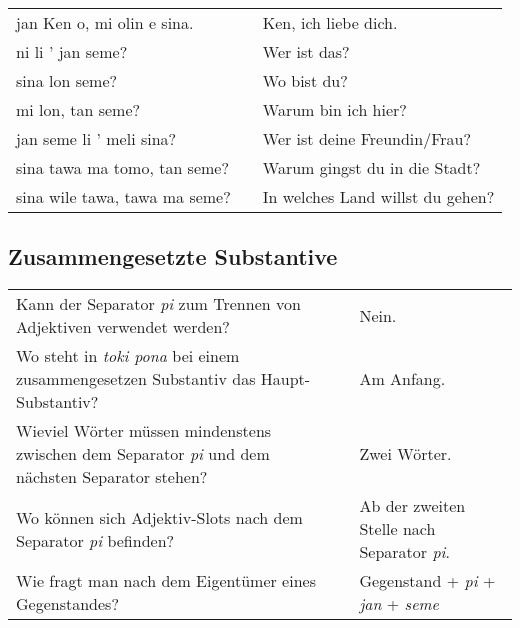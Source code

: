 \begin{supertabular}{p{5,5cm}|ll}
jan Ken o, mi olin e sina.  && Ken, ich liebe dich. \\
ni li ' jan seme?  && Wer ist das? \\
sina lon seme?  && Wo bist du? \\ 
mi lon, tan seme?  && Warum bin ich hier? \\ 
jan seme li ' meli sina?  && Wer ist deine Freundin/Frau? \\
sina tawa ma tomo, tan seme?  && Warum gingst du in die Stadt? \\
sina wile tawa, tawa  ma seme?  && In welches Land willst du gehen? \\
\end{supertabular} 

\newpage
%
\subsection*{Zusammengesetzte Substantive} 
\label{'pi'}

\begin{supertabular}{p{5,5cm}|ll}
Kann der Separator \textit{pi} zum Trennen von Adjektiven verwendet werden? && Nein. \\ %
Wo steht in \textit{toki pona} bei einem zusammengesetzen Substantiv das Haupt-Substantiv? && Am Anfang. \\ %
Wieviel Wörter müssen mindenstens zwischen dem Separator \textit{pi} und dem nächsten Separator stehen? && Zwei Wörter. \\ %
Wo können sich Adjektiv-Slots nach dem Separator \textit{pi} befinden? && Ab der zweiten Stelle nach Separator \textit{pi}. \\ %
Wie fragt man nach dem Eigentümer eines Gegenstandes? && Gegenstand + \textit{pi} + \textit{jan} + \textit{seme}  \\ %
\end{supertabular}

